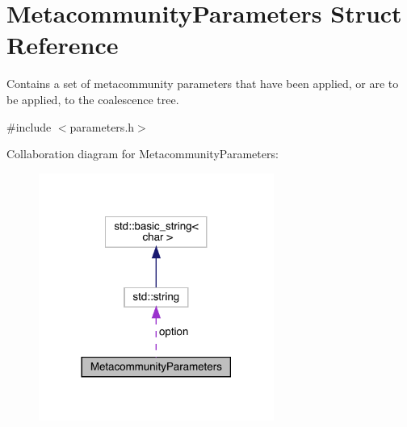 \hypertarget{struct_metacommunity_parameters}{}\section{Metacommunity\+Parameters Struct Reference}
\label{struct_metacommunity_parameters}


Contains a set of metacommunity parameters that have been applied, or are to be applied, to the coalescence tree.  




{\ttfamily \#include $<$parameters.\+h$>$}



Collaboration diagram for Metacommunity\+Parameters\+:
\nopagebreak
\begin{figure}[H]
\begin{center}
\leavevmode
\includegraphics[width=218pt]{struct_metacommunity_parameters__coll__graph}
\end{center}
\end{figure}
